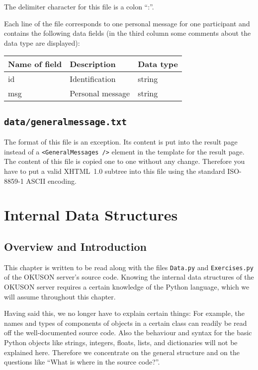 \documentclass[12pt,openany,a4paper]{book}
\newcommand{\OKUSON}{\textsf{OKUSON}}
\begin{document}
The delimiter character for this file is a colon ``:''.

Each line of the file corresponds to one personal message for one
participant and contains the following data fields (in the third column
some comments about the data type are displayed):

\begin{center}
\begin{tabular}{|l|l|l|}
\hline
Name of field & Description & Data type \\
\hline
\hline
id & Identification & string \\
\hline
msg & Personal message & string \\
\hline
\end{tabular}
\end{center}


\section{\texttt{data/generalmessage.txt}}
\label{sec:generalmessage.txt}

The format of this file is an exception. Its content is put into the
result page instead of a \texttt{<GeneralMessages />} element in the
template for the result page. The content of this file is copied one to
one without any change. Therefore you have to put a valid XHTML~1.0 subtree
into this file using the standard ISO-8859-1 ASCII encoding.


\chapter{Internal Data Structures}
\label{ch:intdata}

\section{Overview and Introduction}

This chapter is written to be read along with the files \texttt{Data.py}
and \texttt{Exercises.py} of the {\OKUSON} server's source code.
Knowing the internal data structures of the {\OKUSON} server requires 
a certain knowledge of the Python language, which we will assume throughout
this chapter.

Having said this, we no longer have to explain certain things: For example,
the names and types of components of objects in a certain class can readily
be read off the well-documented source code. Also the behaviour and syntax
for the basic Python objects like strings, integers, floats, lists,
and dictionaries will not be explained here. Therefore we concentrate
on the general structure and on the questions like ``What is where in
the source code?''.
\end{document}
